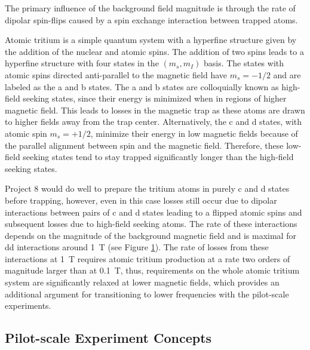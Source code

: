 \begin{figure}[htbp]
\begin{subfigure}{0.49\textwidth}
        \caption{}
    \end{subfigure}
    \caption{}
    \label{fig:chap3-dipolarloss}
 \end{figure}
 The primary influence of the background field magnitude is through the rate of dipolar spin-flips caused by a spin exchange interaction between trapped atoms. 
 
 Atomic tritium is a simple quantum system with a hyperfine structure given by the addition of the nuclear and atomic spins. The addition of two spins leads to a hyperfine structure with four states in the $(m_s,m_I)$ basis. The states with atomic spins directed anti-parallel to the magnetic field have $m_s=-1/2$ and are labeled as the a and b states. The a and b states are colloquially known as high-field seeking states, since their energy is minimized when in regions of higher magnetic field. This leads to losses in the magnetic trap as these atoms are drawn to higher fields away from the trap center. Alternatively, the c and d states, with atomic spin $m_s=+1/2$, minimize their energy in low magnetic fields because of the parallel alignment between spin and the magnetic field. Therefore, these low-field seeking states tend to stay trapped significantly longer than the high-field seeking states.

 Project 8 would do well to prepare the tritium atoms in purely c and d states before trapping, however, even in this case losses still occur due to dipolar interactions between pairs of c and d states leading to a flipped atomic spins and subsequent losses due to high-field seeking atoms. The rate of these interactions depends on the magnitude of the background magnetic field and is maximal for dd interactions around 1~T (see Figure \ref{fig:chap3-dipolarloss}). The rate of losses from these interactions at 1~T requires atomic tritium production at a rate two orders of magnitude larger than at 0.1~T, thus, requirements on the whole atomic tritium system are significantly relaxed at lower magnetic fields, which provides an additional argument for transitioning to lower frequencies with the pilot-scale experiments.

\subsection{Pilot-scale Experiment Concepts}

